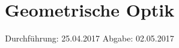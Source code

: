 

\subject{V408}
\title{Geometrische Optik}
\date{
\centering
  Durchführung: 25.04.2017
  \hspace{3em}
  Abgabe: 02.05.2017
}



\maketitle
\thispagestyle{empty}
\tableofcontents
\newpage



%




\printbibliography



